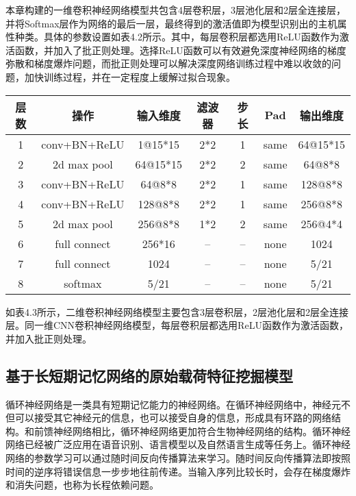 本章构建的一维卷积神经网络模型共包含4层卷积层，3层池化层和2层全连接层，并将Softmax层作为网络的最后一层，最终得到的激活值即为模型识别出的主机属性种类。具体的参数设置如表4.2所示。其中，每层卷积层都选用ReLU函数作为激活函数，并加入了批正则处理。选择ReLU函数可以有效避免深度神经网络的梯度弥散和梯度爆炸问题，而批正则处理可以解决深度网络训练过程中难以收敛的问题，加快训练过程，并在一定程度上缓解过拟合现象。

\begin{table}[!h]
    \centering
    \footnotesize
    \setlength{\tabcolsep}{8pt}
    \renewcommand{\arraystretch}{1}
\begin{tabular}{ccccccc}
\toprule
层数&操作&输入维度&滤波器&步长&Pad&输出维度\\
\hline
1 & conv+BN+ReLU & 1@15*15 & 2*2 & 1 & same & 64@15*15 
\\ 
2 & 2d max pool & 64@15*15 & 2*2 & 2 & same & 64@8*8 
\\ 
3 & conv+BN+ReLU & 64@8*8 & 2*2 & 1 & same & 128@8*8
\\ 
4 & conv+BN+ReLU & 128@8*8 & 2*2 & 1 & same & 256@8*8
\\ 
5 & 2d max pool & 256@8*8 & 1*2 & 2 & same & 256@4*4
\\ 
6 & full connect & 256*16 & -- & -- & none & 1024
\\ 
7 & full connect & 1024 & -- & -- & none & 5/21
\\ 
8 & softmax & 5/21 & -- & -- & none & 5/21
\\ 
\bottomrule
\end{tabular}
\end{table}

如表4.3所示，二维卷积神经网络模型主要包含3层卷积层，2层池化层和2层全连接层。同一维CNN卷积神经网络模型，每层卷积层都选用ReLU函数作为激活函数，并加入批正则处理。

\subsection{基于长短期记忆网络的原始载荷特征挖掘模型}

循环神经网络是一类具有短期记忆能力的神经网络。在循环神经网络中，神经元不但可以接受其它神经元的信息，也可以接受自身的信息，形成具有环路的网络结构。和前馈神经网络相比，循环神经网络更加符合生物神经网络的结构。循环神经网络已经被广泛应用在语音识别、语言模型以及自然语言生成等任务上。循环神经网络的参数学习可以通过随时间反向传播算法来学习。随时间反向传播算法即按照时间的逆序将错误信息一步步地往前传递。当输入序列比较长时，会存在梯度爆炸和消失问题，也称为长程依赖问题。

